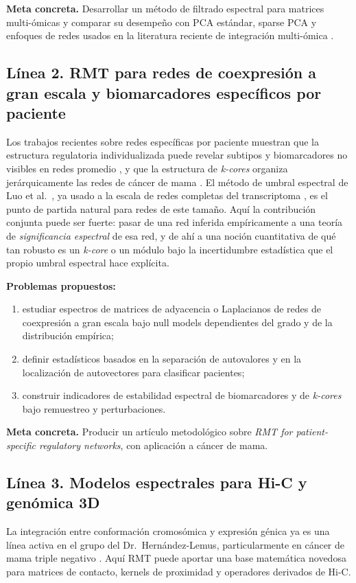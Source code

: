 \documentclass[11pt]{article}
\begin{document}
\textbf{Meta concreta.} Desarrollar un método de filtrado espectral para matrices multi-ómicas y comparar su desempeño con PCA estándar, sparse PCA y enfoques de redes usados en la literatura reciente de integración multi-ómica \cite{multiomic2024, multiomic2022}.

\subsection{Línea 2. RMT para redes de coexpresión a gran escala y biomarcadores específicos por paciente}
Los trabajos recientes sobre redes específicas por paciente muestran que la estructura regulatoria individualizada puede revelar subtipos y biomarcadores no visibles en redes promedio \cite{luad2025}, y que la estructura de \emph{k-cores} organiza jerárquicamente las redes de cáncer de mama \cite{kcore2021}. El método de umbral espectral de Luo et al.\ \cite{luo2007}, ya usado a la escala de redes completas del transcriptoma \cite{gao2012}, es el punto de partida natural para redes de este tamaño. Aquí la contribución conjunta puede ser fuerte: pasar de una red inferida empíricamente a una teoría de \emph{significancia espectral} de esa red, y de ahí a una noción cuantitativa de qué tan robusto es un \emph{k-core} o un módulo bajo la incertidumbre estadística que el propio umbral espectral hace explícita.

\textbf{Problemas propuestos:}
\begin{enumerate}[label=(\alph*)]
    \item estudiar espectros de matrices de adyacencia o Laplacianos de redes de coexpresión a gran escala bajo null models dependientes del grado y de la distribución empírica;
    \item definir estadísticos basados en la separación de autovalores y en la localización de autovectores para clasificar pacientes;
    \item construir indicadores de estabilidad espectral de biomarcadores y de \emph{k-cores} bajo remuestreo y perturbaciones.
\end{enumerate}

\textbf{Meta concreta.} Producir un artículo metodológico sobre \emph{RMT for patient-specific regulatory networks}, con aplicación a cáncer de mama.

\subsection{Línea 3. Modelos espectrales para Hi-C y genómica 3D}
La integración entre conformación cromosómica y expresión génica ya es una línea activa en el grupo del Dr.\ Hernández-Lemus, particularmente en cáncer de mama triple negativo \cite{tnbc2025}. Aquí RMT puede aportar una base matemática novedosa para matrices de contacto, kernels de proximidad y operadores derivados de Hi-C.
\end{document}
